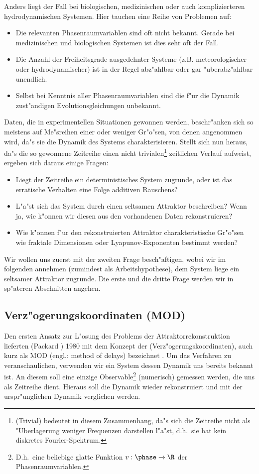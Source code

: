 Anders liegt der Fall bei biologischen, medizinischen oder auch komplizierteren
hydrodynamischen Systemen. Hier tauchen eine Reihe von Problemen auf:
\begin{itemize}
\item Die relevanten Phasenraumvariablen sind oft nicht bekannt. Gerade bei
medizinischen und biologischen Systemen ist dies sehr oft der Fall.
\item Die Anzahl der Freiheitsgrade ausgedehnter Systeme (z.B. meteorologischer oder
hydrodynamischer) ist in der Regel abz"ahlbar oder gar "uberabz"ahlbar unendlich. 
\item Selbst bei Kenntnis aller Phasenraumvariablen sind die f"ur die Dynamik zust"andigen
Evolutionsgleichungen unbekannt.
\end{itemize}
Daten, die in experimentellen Situationen gewonnen werden, beschr"anken sich so meistens
auf Me"sreihen einer oder weniger Gr"o"sen, von denen angenommen wird, da"s  sie die
Dynamik des Systems charakterisieren. Stellt sich nun heraus, da"s die so gewonnene
Zeitreihe einen nicht trivialen\footnote{\begriff(Trivial) bedeutet in diesem
  Zusammenhang, da"s sich die Zeitreihe nicht als "Uberlagerung weniger Frequenzen
  darstellen l"a"st, d.h.\  sie hat kein diskretes
Fourier-Spektrum.} zeitlichen Verlauf aufweist, ergeben sich daraus einige Fragen:
\begin{itemize}
\item Liegt der Zeitreihe ein deterministisches System zugrunde, oder ist das erratische
Verhalten eine Folge additiven Rauschens?
\item L"a"st sich das System durch einen seltsamen Attraktor beschreiben? Wenn ja, wie
k"onnen wir diesen aus den vorhandenen Daten rekonstruieren?
\item Wie k"onnen f"ur den rekonstruierten Attraktor charakteristische Gr"o"sen wie
fraktale Dimensionen oder Lyapunov-Exponenten bestimmt werden?
\end{itemize}
Wir wollen uns zuerst mit der zweiten Frage besch"aftigen, wobei wir im folgenden annehmen
(zumindest als Arbeitshypothese), dem System liege ein seltsamer Attraktor zugrunde.
Die erste und die dritte Frage werden wir in sp"ateren Abschnitten angehen.

\subsection{Verz"ogerungskoordinaten (MOD)}

Den ersten Ansatz zur L"osung des Problems der Attraktorrekonstruktion  lieferten
\linebreak \autor(Packard \etal) 1980
mit dem Konzept der \begriff(Verz"ogerungskoordinaten), auch kurz als
MOD (engl.: method of delays) bezeichnet \cite{Packard80}. Um das Verfahren 
zu veranschaulichen, verwenden wir ein System dessen Dynamik uns bereits bekannt ist. An
diesem soll eine einzige Observable\footnote{D.h.\   eine beliebige glatte Funktion
$v:\phase\to\R$ der Phasenraumvariablen.} (numerisch) gemessen werden, die uns als Zeitreihe
dient. Hieraus soll die Dynamik wieder rekonstruiert und mit der urspr"unglichen Dynamik
verglichen werden.


